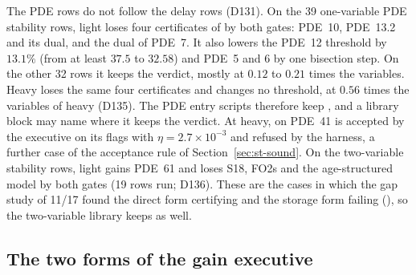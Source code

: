 The PDE rows do not follow the delay rows (D131). On the 39 one-variable PDE stability rows, light  loses four certificates of  by both gates: PDE~10, PDE~13.2 and its dual, and the dual of PDE~7. It also lowers the PDE~12 threshold by $13.1\%$ (from at least $37.5$ to $32.58$) and PDE~5 and 6 by one bisection step. On the other 32 rows it keeps the verdict, mostly at $0.12$ to $0.21$ times the variables. Heavy  loses the same four certificates and changes no threshold, at $0.56$ times the variables of heavy  (D135). The PDE entry scripts therefore keep , and a library block may name  where it keeps the verdict. At heavy,  on PDE~41 is accepted by the executive on its flags with $\eta=2.7\times10^{-3}$ and refused by the harness, a further case of the acceptance rule of Section~\ref{sec:st-sound}. On the two-variable stability rows, light  gains PDE~61 and loses S18, FO2s and the age-structured model by both gates (19 rows run; D136). These are the cases in which the gap study of 11/17 found the direct form certifying and the storage form failing (\gapsref), so the two-variable library keeps  as well.

\subsection{The two forms of the gain executive}\label{sec:st-gain}

